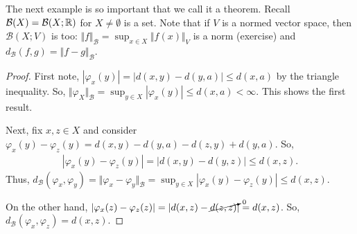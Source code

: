 \documentclass{report}
\begin{document}
The next example is so important that we call it a theorem. Recall $\mathcal B(X) = \mathcal B(X; \RR)$ for $X \neq \emptyset$ is a set. Note that if $V$ is a normed vector space, then $\mathcal B(X; V)$ is too: $\Vert f \Vert_{\mathcal B} = \sup_{x \in X}\Vert f(x) \Vert_V$ is a norm (exercise) and $d_{\mathcal B}(f, g) = \Vert f -g \Vert_{\mathcal B}$. 

\begin{proof}
    First note, $|\varphi_x(y)| = |d(x, y) - d(y, a)| \leq d(x, a)$ by the triangle inequality. So, $\Vert \varphi_X \Vert_{\mathcal B} = \sup_{y \in X} |\varphi_x(y)| \leq d(x, a) < \infty$. This shows the first result.

    Next, fix $x, z \in X$ and consider $\varphi_x(y) - \varphi_z(y) = d(x, y) - d(y, a) - d(z, y) + d(y, a)$. So,
    \begin{align*}
        |\varphi_x(y) - \varphi_z(y)| = |d(x, y) - d(y, z)| \leq d(x, z).
    \end{align*}
    Thus, $d_{\mathcal B}(\varphi_x, \varphi_y) = \Vert \varphi_x - \varphi_y \Vert_{\mathcal B} = \sup_{y \in X} |\varphi_x(y) - \varphi_z(y)| \leq d(x, z)$.

    On the other hand, $|\varphi_x(z) - \varphi_z(z)| = |d(x, z) - \cancelto{0}{d(z, z)}| = d(x, z)$. So, $d_{\mathcal B}(\varphi_x, \varphi_z) = d(x, z)$. 
\end{proof}
\end{document}
